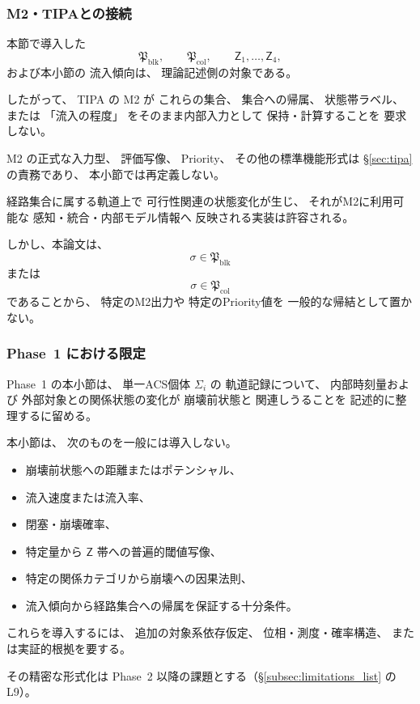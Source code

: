 \subsubsection{M2・TIPAとの接続}

\begin{remark}
\label{rem:path_sets_m2_connection}
本節で導入した
\[
  \mathfrak{P}_{\mathrm{blk}},
  \qquad
  \mathfrak{P}_{\mathrm{col}},
  \qquad
  \mathsf{Z}_1,\ldots,\mathsf{Z}_4,
\]
および本小節の
流入傾向は、
理論記述側の対象である。

したがって、
TIPA の M2 が
これらの集合、
集合への帰属、
状態帯ラベル、
または
「流入の程度」
をそのまま内部入力として
保持・計算することを
要求しない。

M2 の正式な入力型、
評価写像、
Priority、
その他の標準機能形式は
\S\ref{sec:tipa}
の責務であり、
本小節では再定義しない。

経路集合に属する軌道上で
可行性関連の状態変化が生じ、
それがM2に利用可能な
感知・統合・内部モデル情報へ
反映される実装は許容される。

しかし、本論文は、
\[
  \sigma\in\mathfrak{P}_{\mathrm{blk}}
\]
または
\[
  \sigma\in\mathfrak{P}_{\mathrm{col}}
\]
であることから、
特定のM2出力や
特定のPriority値を
一般的な帰結として置かない。
\end{remark}

\subsubsection{Phase~1 における限定}

\begin{remark}
\label{rem:inflow_phase1_scope}
Phase~1 の本小節は、
単一ACS個体 $\Sigma_i$ の
軌道記録について、
内部時刻量および
外部対象との関係状態の変化が
崩壊前状態と
関連しうることを
記述的に整理するに留める。

本小節は、
次のものを一般には導入しない。

\begin{itemize}
  \item
  崩壊前状態への距離またはポテンシャル、
  \item
  流入速度または流入率、
  \item
  閉塞・崩壊確率、
  \item
  特定量から $\mathsf{Z}$ 帯への普遍的閾値写像、
  \item
  特定の関係カテゴリから崩壊への因果法則、
  \item
  流入傾向から経路集合への帰属を保証する十分条件。
\end{itemize}

これらを導入するには、
追加の対象系依存仮定、
位相・測度・確率構造、
または実証的根拠を要する。

その精密な形式化は
Phase~2 以降の課題とする（\S\ref{subsec:limitations_list} の L9）。
\end{remark}

